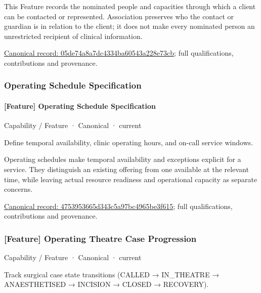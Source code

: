 This Feature records the nominated people and capacities through which a client can be contacted or represented. Association preserves who the contact or guardian is in relation to the client; it does not make every nominated person an unrestricted recipient of clinical information.


{\footnotesize \href{../../../../continuum/strategy/capability/feature/05de74a8a7dc4334ba60543a228e73cb.md}{Canonical record: 05de74a8a7dc4334ba60543a228e73cb}; full qualifications, contributions and provenance.}\par
\subsubsection{Operating Schedule Specification}

\paragraph{[Feature] Operating Schedule Specification}

\label{element:4753953665d343c5a97bc4965be3f615}
{\small Capability / Feature · Canonical · current}\par

Define temporal availability, clinic operating hours, and on-call service windows.



Operating schedules make temporal availability and exceptions explicit for a service. They distinguish an existing offering from one available at the relevant time, while leaving actual resource readiness and operational capacity as separate concerns.


{\footnotesize \href{../../../../continuum/strategy/capability/feature/4753953665d343c5a97bc4965be3f615.md}{Canonical record: 4753953665d343c5a97bc4965be3f615}; full qualifications, contributions and provenance.}\par
\subsubsection{[Feature] Operating Theatre Case Progression}

\label{element:2fd65f09f7384f0486280e56ec5a9e84}
{\small Capability / Feature · Canonical · current}\par

Track surgical case state transitions (CALLED → IN\_THEATRE → ANAESTHETISED → INCISION → CLOSED → RECOVERY).



